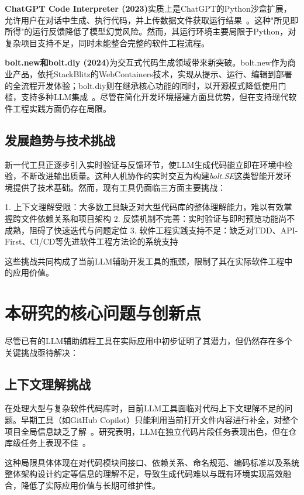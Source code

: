 \textbf{ChatGPT Code Interpreter (2023)}实质上是ChatGPT的Python沙盒扩展，允许用户在对话中生成、执行代码，并上传数据文件获取运行结果~\cite{FirstBlush2023}。这种"所见即所得"的运行反馈降低了模型幻觉风险。然而，其运行环境主要局限于Python，对复杂项目支持不足，同时未能整合完整的软件工程流程。

\textbf{bolt.new和bolt.diy (2024)}为交互式代码生成领域带来新突破。bolt.new作为商业产品，依托StackBlitz的WebContainers技术，实现从提示、运行、编辑到部署的全流程开发体验；bolt.diy则在继承核心功能的同时，以开源模式降低使用门槛，支持多种LLM集成~\cite{BoltNew2024, BoltDIY2024}。尽管在简化开发环境搭建方面具优势，但在支持现代软件工程实践方面仍存在局限。

\subsection{发展趋势与技术挑战}

新一代工具正逐步引入实时验证与反馈环节，使LLM生成代码能立即在环境中检验，不断改进输出质量。这种人机协作的实时交互为构建\emph{bolt.SE}这类智能开发环境提供了技术基础。然而，现有工具仍面临三方面主要挑战：

1. 上下文理解受限：大多数工具缺乏对大型代码库的整体理解能力，难以有效掌握跨文件依赖关系和项目架构
2. 反馈机制不完善：实时验证与即时预览功能尚不成熟，阻碍了快速迭代与问题定位
3. 软件工程实践支持不足：缺乏对TDD、API-First、CI/CD等先进软件工程方法论的系统支持

这些挑战共同构成了当前LLM辅助开发工具的瓶颈，限制了其在实际软件工程中的应用价值。

\section{本研究的核心问题与创新点}

尽管已有的LLM辅助编程工具在实际应用中初步证明了其潜力，但仍然存在多个关键挑战亟待解决：

\subsection{上下文理解挑战}

在处理大型与复杂软件代码库时，目前LLM工具面临对代码上下文理解不足的问题。早期工具（如GitHub Copilot）只能利用当前打开文件内容进行补全，对整个项目全局信息缺乏了解~\cite{DivaCopilot}。研究表明，LLM在独立代码片段任务表现出色，但在仓库级任务上表现不佳~\cite{LLMCodeGraph2024}。

这种局限具体体现在对代码模块间接口、依赖关系、命名规范、编码标准以及系统整体架构设计约定等信息的理解不足，导致生成代码难以与既有环境实现高效融合，降低了实际应用价值与长期可维护性。

